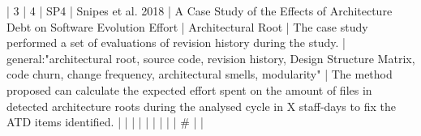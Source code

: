 |  3 |          4 | SP4  | Snipes et al. 2018                                                   | A Case Study of the Effects of Architecture Debt on Software Evolution Effort                                                                                            | Architectural Root                                                                                                                                                                                                                                       | The case study performed a set of evaluations of revision history during the study.                                                                                                                                                                                | general:"architectural root, source code, revision history, Design Structure Matrix, code churn, change frequency, architectural smells, modularity"                                                                                                                                                     | The method proposed can calculate the expected effort spent on the amount of files in detected architecture roots during the analysed cycle in X staff-days to fix the ATD items identified.                                                                                                                                                                                                                                                                                             |
|    |            |      |                                                                      |                                                                                                                                                                          |                                                                                                                                                                                                                                                            |                                                                                                                                                                                                                                                                      |  #                                                                                                                                                                                                                                                                                                       |                                                                                                                                                                                                                                                                                                                                                                                                                                                                                              |
